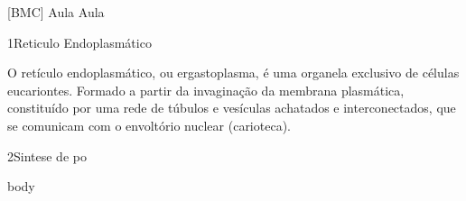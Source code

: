 \documentclass[\mainfilename]{subfiles}
\begin{document}
[BMC]
{Aula}
{Aula}

\begin{sectionBox}1{Reticulo Endoplasmático}
    
    O retículo endoplasmático, ou ergastoplasma, é uma organela exclusivo de células eucariontes. Formado a partir da invaginação da membrana plasmática, constituído por uma rede de túbulos e vesículas achatados e interconectados, que se comunicam com o envoltório nuclear (carioteca).
    
\end{sectionBox}

\begin{sectionBox}2{Sintese de po}
    
    body
    
\end{sectionBox}
\end{document}
